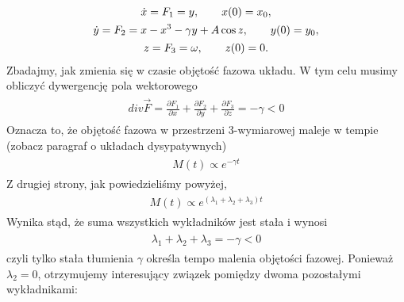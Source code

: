 \documentclass[a4paper,12pt,polish]{sphinxmanual}
\begin{document}
\label{ch2/chII012:equation-eqn11}\begin{gather}
\begin{split}\dot x = F_1 = y , \qquad x(0) = x_0,\end{split}\label{ch2/chII012-eqn11}\\\begin{split}\dot y = F_2 = x - x^3 -\gamma y + A \cos z , \qquad y(0) = y_0,\end{split}\notag\\\begin{split}z = F_3 = \omega, \qquad z(0) = 0.\end{split}\notag
\end{gather}
Zbadajmy, jak zmienia się w czasie objętość fazowa układu.  W tym celu musimy obliczyć dywergencję pola wektorowego
\label{ch2/chII012:equation-eqn12}\begin{gather}
\begin{split} div  \vec F = \frac{\partial F_1}{\partial x} + \frac{\partial F_2}{\partial y} + \frac{\partial F_3}{\partial z}  = -\gamma < 0\end{split}\label{ch2/chII012-eqn12}
\end{gather}
Oznacza to, że objętość fazowa w przestrzeni 3-wymiarowej maleje w tempie (zobacz paragraf o układach dysypatywnych)
\label{ch2/chII012:equation-eqn13}\begin{gather}
\begin{split}M(t) \propto e^{-\gamma t}\end{split}\label{ch2/chII012-eqn13}
\end{gather}
Z drugiej strony, jak powiedzieliśmy powyżej,
\label{ch2/chII012:equation-eqn14}\begin{gather}
\begin{split}M(t)  \propto e^{(\lambda_1 + \lambda_2 + \lambda_3) t}\end{split}\label{ch2/chII012-eqn14}
\end{gather}
Wynika stąd, że suma wszystkich wykładników jest stała i wynosi
\label{ch2/chII012:equation-eqn15}\begin{gather}
\begin{split}\lambda_1 + \lambda_2 + \lambda_3 = -\gamma  <  0\end{split}\label{ch2/chII012-eqn15}
\end{gather}
czyli tylko stała tłumienia $\gamma$ określa tempo malenia objętości fazowej.  Ponieważ $\lambda_2 =0$, otrzymujemy interesujący związek pomiędzy dwoma pozostałymi wykładnikami:
\end{document}

